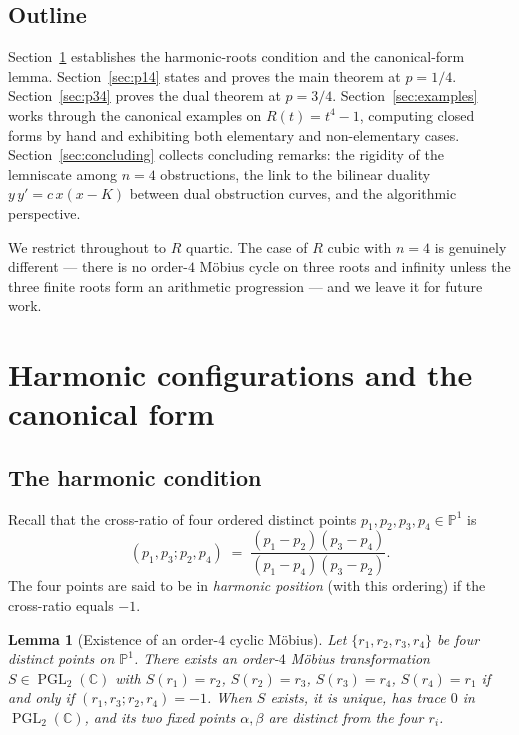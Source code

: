 \documentclass[11pt,a4paper]{article}
\theoremstyle{plain}
\newtheorem{lemma}[theorem]{Lemma}
\theoremstyle{definition}
\theoremstyle{remark}
\newcommand{\C}{\mathbb{C}}
\newcommand{\PGL}{\operatorname{PGL}}
\begin{document}
\subsection*{Outline}

Section~\ref{sec:harmonic} establishes the harmonic-roots condition and the canonical-form lemma. Section~\ref{sec:p14} states and proves the main theorem at $p=1/4$. Section~\ref{sec:p34} proves the dual theorem at $p=3/4$. Section~\ref{sec:examples} works through the canonical examples on $R(t) = t^4 - 1$, computing closed forms by hand and exhibiting both elementary and non-elementary cases. Section~\ref{sec:concluding} collects concluding remarks: the rigidity of the lemniscate among $n=4$ obstructions, the link to the bilinear duality $y\,y' = c\, x(x-K)$ between dual obstruction curves, and the algorithmic perspective.

We restrict throughout to $R$ quartic. The case of $R$ cubic with $n=4$ is genuinely different — there is no order-$4$ Möbius cycle on three roots and infinity unless the three finite roots form an arithmetic progression — and we leave it for future work.

\section{Harmonic configurations and the canonical form}\label{sec:harmonic}

\subsection*{The harmonic condition}

Recall that the cross-ratio of four ordered distinct points $p_1, p_2, p_3, p_4 \in \mathbb{P}^1$ is
\[
  (p_1, p_3; p_2, p_4) \;=\; \frac{(p_1 - p_2)(p_3 - p_4)}{(p_1 - p_4)(p_3 - p_2)}.
\]
The four points are said to be in \emph{harmonic position} (with this ordering) if the cross-ratio equals $-1$.

\begin{lemma}[Existence of an order-$4$ cyclic Möbius]\label{lem:harmonic-mobius}
Let $\{r_1, r_2, r_3, r_4\}$ be four distinct points on $\mathbb{P}^1$. There exists an order-$4$ Möbius transformation $S \in \PGL_2(\C)$ with $S(r_1) = r_2$, $S(r_2) = r_3$, $S(r_3) = r_4$, $S(r_4) = r_1$ if and only if $(r_1, r_3; r_2, r_4) = -1$. When $S$ exists, it is unique, has trace $0$ in $\PGL_2(\C)$, and its two fixed points $\alpha, \beta$ are distinct from the four $r_i$.
\end{lemma}
\end{document}
